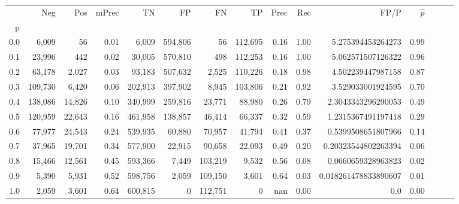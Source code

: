 \begin{tabular}{rrrrrrrrrrrrrrr}
\toprule
{} &      Neg &     Pos & mPrec &       TN &       FP &       FN &       TP &  Prec &   Rec &                  FP/P & $\hat{p}$ \\
p   &          &         &       &          &          &          &          &       &       &                       &           \\
\midrule
0.0 &    6,009 &      56 &  0.01 &    6,009 &  594,806 &       56 &  112,695 &  0.16 &  1.00 &     5.275394453264273 &      0.99 \\
0.1 &   23,996 &     442 &  0.02 &   30,005 &  570,810 &      498 &  112,253 &  0.16 &  1.00 &     5.062571507126322 &      0.96 \\
0.2 &   63,178 &   2,027 &  0.03 &   93,183 &  507,632 &    2,525 &  110,226 &  0.18 &  0.98 &     4.502239447987158 &      0.87 \\
0.3 &  109,730 &   6,420 &  0.06 &  202,913 &  397,902 &    8,945 &  103,806 &  0.21 &  0.92 &     3.529033001924595 &      0.70 \\
0.4 &  138,086 &  14,826 &  0.10 &  340,999 &  259,816 &   23,771 &   88,980 &  0.26 &  0.79 &    2.3043343296290053 &      0.49 \\
0.5 &  120,959 &  22,643 &  0.16 &  461,958 &  138,857 &   46,414 &   66,337 &  0.32 &  0.59 &    1.2315367491197418 &      0.29 \\
0.6 &   77,977 &  24,543 &  0.24 &  539,935 &   60,880 &   70,957 &   41,794 &  0.41 &  0.37 &    0.5399508651807966 &      0.14 \\
0.7 &   37,965 &  19,701 &  0.34 &  577,900 &   22,915 &   90,658 &   22,093 &  0.49 &  0.20 &   0.20323544802263394 &      0.06 \\
0.8 &   15,466 &  12,561 &  0.45 &  593,366 &    7,449 &  103,219 &    9,532 &  0.56 &  0.08 &    0.0660659328963823 &      0.02 \\
0.9 &    5,390 &   5,931 &  0.52 &  598,756 &    2,059 &  109,150 &    3,601 &  0.64 &  0.03 &  0.018261478833890607 &      0.01 \\
1.0 &    2,059 &   3,601 &  0.64 &  600,815 &        0 &  112,751 &        0 &   nan &  0.00 &                   0.0 &      0.00 \\
\bottomrule
\end{tabular}
